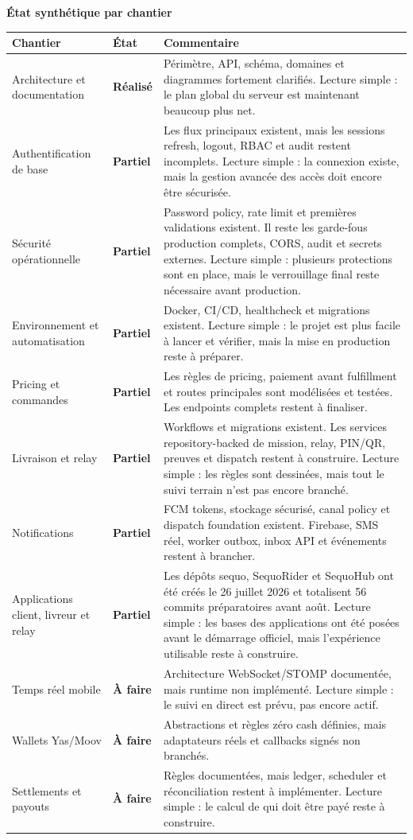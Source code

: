 \documentclass[11pt,letterpaper]{article}
\newcommand{\sectiontitle}[1]{%
  \vspace{0.55em}
  {\Large\bfseries\color{SequoInk}#1}\par
  \vspace{0.1em}
}
\newcommand{\statusdone}{\textbf{\color{SequoGreen}Réalisé}}
\newcommand{\statuspartial}{\textbf{\color{SequoBlue}Partiel}}
\newcommand{\statuspending}{\textbf{\color{SequoMuted}À faire}}
\begin{document}
\newpage
\sectiontitle{État synthétique par chantier}
{\small
\begin{tabularx}{\linewidth}{@{}L{3.3cm}L{1.9cm}Y@{}}
\toprule
{}
\textbf{Chantier} & \textbf{État} & \textbf{Commentaire} \\
\midrule
Architecture et documentation & \statusdone & Périmètre, API, schéma, domaines et diagrammes fortement clarifiés. Lecture simple : le plan global du serveur est maintenant beaucoup plus net. \\
Authentification de base & \statuspartial & Les flux principaux existent, mais les sessions refresh, logout, RBAC et audit restent incomplets. Lecture simple : la connexion existe, mais la gestion avancée des accès doit encore être sécurisée. \\
Sécurité opérationnelle & \statuspartial & Password policy, rate limit et premières validations existent. Il reste les garde-fous production complets, CORS, audit et secrets externes. Lecture simple : plusieurs protections sont en place, mais le verrouillage final reste nécessaire avant production. \\
Environnement et automatisation & \statuspartial & Docker, CI/CD, healthcheck et migrations existent. Lecture simple : le projet est plus facile à lancer et vérifier, mais la mise en production reste à préparer. \\
Pricing et commandes & \statuspartial & Les règles de pricing, paiement avant fulfillment et routes principales sont modélisées et testées. Les endpoints complets restent à finaliser. \\
Livraison et relay & \statuspartial & Workflows et migrations existent. Les services repository-backed de mission, relay, PIN/QR, preuves et dispatch restent à construire. Lecture simple : les règles sont dessinées, mais tout le suivi terrain n'est pas encore branché. \\
Notifications & \statuspartial & FCM tokens, stockage sécurisé, canal policy et dispatch foundation existent. Firebase, SMS réel, worker outbox, inbox API et événements restent à brancher. \\
Applications client, livreur et relay & \statuspartial & Les dépôts sequo, SequoRider et SequoHub ont été créés le 26 juillet 2026 et totalisent 56 commits préparatoires avant août. Lecture simple : les bases des applications ont été posées avant le démarrage officiel, mais l'expérience utilisable reste à construire. \\
Temps réel mobile & \statuspending & Architecture WebSocket/STOMP documentée, mais runtime non implémenté. Lecture simple : le suivi en direct est prévu, pas encore actif. \\
Wallets Yas/Moov & \statuspending & Abstractions et règles zéro cash définies, mais adaptateurs réels et callbacks signés non branchés. \\
Settlements et payouts & \statuspending & Règles documentées, mais ledger, scheduler et réconciliation restent à implémenter. Lecture simple : le calcul de qui doit être payé reste à construire. \\
\bottomrule
\end{tabularx}
}
\end{document}
